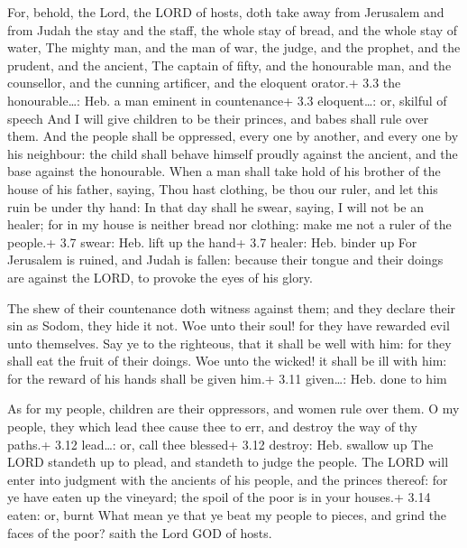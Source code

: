  For, behold, the Lord, the LORD of hosts, doth take away
from Jerusalem and from Judah the stay and the staff, the whole stay of
bread, and the whole stay of water,  The mighty man, and the
man of war, the judge, and the prophet, and the prudent, and the
ancient,  The captain of fifty, and the honourable man, and
the counsellor, and the cunning artificer, and the eloquent orator.+ 3.3
the honourable\ldots: Heb. a man eminent in countenance+ 3.3
eloquent\ldots: or, skilful of speech  And I will give
children to be their princes, and babes shall rule over them.
 And the people shall be oppressed, every one by another,
and every one by his neighbour: the child shall behave himself proudly
against the ancient, and the base against the honourable. 
When a man shall take hold of his brother of the house of his father,
saying, Thou hast clothing, be thou our ruler, and let this ruin be
under thy hand:  In that day shall he swear, saying, I will
not be an healer; for in my house is neither bread nor clothing: make me
not a ruler of the people.+ 3.7 swear: Heb. lift up the hand+ 3.7
healer: Heb. binder up  For Jerusalem is ruined, and Judah
is fallen: because their tongue and their doings are against the LORD,
to provoke the eyes of his glory.

 The shew of their countenance doth witness against them;
and they declare their sin as Sodom, they hide it not. Woe unto their
soul! for they have rewarded evil unto themselves.  Say ye
to the righteous, that it shall be well with him: for they shall eat the
fruit of their doings.  Woe unto the wicked! it shall be
ill with him: for the reward of his hands shall be given him.+ 3.11
given\ldots: Heb. done to him

 As for my people, children are their oppressors, and
women rule over them. O my people, they which lead thee cause thee to
err, and destroy the way of thy paths.+ 3.12 lead\ldots: or, call thee
blessed+ 3.12 destroy: Heb. swallow up  The LORD standeth
up to plead, and standeth to judge the people.  The LORD
will enter into judgment with the ancients of his people, and the
princes thereof: for ye have eaten up the vineyard; the spoil of the
poor is in your houses.+ 3.14 eaten: or, burnt  What mean
ye that ye beat my people to pieces, and grind the faces of the poor?
saith the Lord GOD of hosts.

